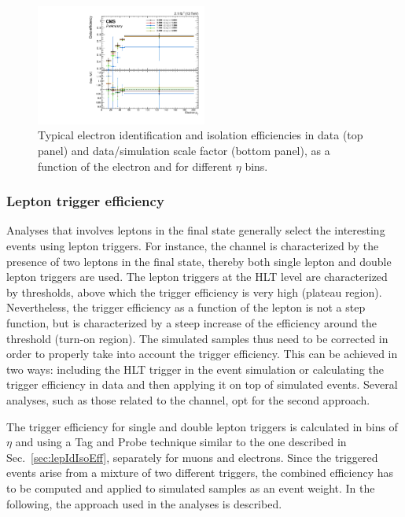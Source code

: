 \begin{figure}[htb]
\centering
\includegraphics[width=0.5\textwidth]{images/effEleIdIso.pdf}
\caption{Typical electron identification and isolation efficiencies in data (top panel) and data/simulation scale factor (bottom panel), as a function of the electron \pt and for different $\eta$ bins.}\label{fig:eleIdIso}
\end{figure}
	
\subsubsection{Lepton trigger efficiency}\label{sec:trigeff}
Analyses that involves leptons in the final state generally select the interesting events using lepton triggers. For instance, the \hwwllnn channel is characterized by the presence of two leptons in the final state, thereby both single lepton and double lepton triggers are used. The lepton triggers at the HLT level are characterized by \pt thresholds, above which the trigger efficiency is very high (plateau region). Nevertheless, the trigger efficiency as a function of the lepton \pt is not a step function, but is characterized by a steep increase of the efficiency around the \pt threshold (turn-on region). The simulated samples thus need to be corrected in order to properly take into account the trigger efficiency. This can be achieved in two ways: including the HLT trigger in the event simulation or calculating the trigger efficiency in data and then applying it on top of simulated events. Several analyses, such as those related to the \hwwllnn channel, opt for the second approach.

The trigger efficiency for single and double lepton triggers is calculated in bins of $\eta$ and \pt using a Tag and Probe technique similar to the one described in Sec.~\ref{sec:lepIdIsoEff}, separately for muons and electrons. Since the triggered events arise from a mixture of two different triggers, the combined efficiency has to be computed and applied to simulated samples as an event weight. In the following, the approach used in the \hwwllnn analyses is described.

